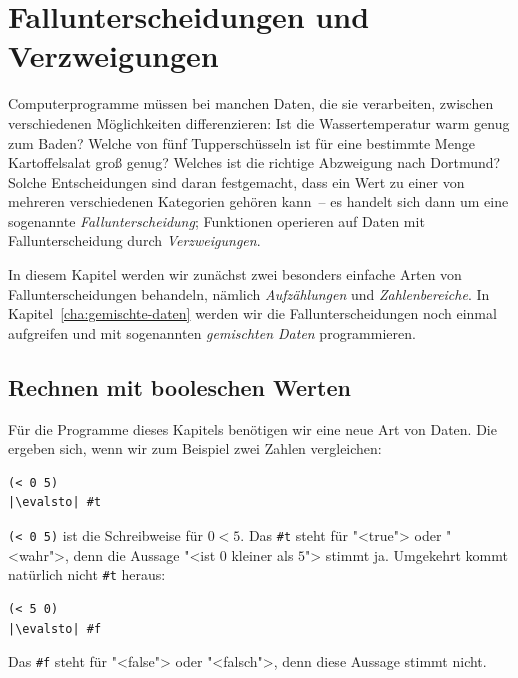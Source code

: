 
\chapter{Fallunterscheidungen und Verzweigungen}
\label{cha:conditionals}

Computerprogramme müssen bei manchen Daten, die sie
verarbeiten, zwischen verschiedenen Möglichkeiten differenzieren: Ist
die Wassertemperatur warm genug zum Baden?  Welche von fünf
Tupperschüsseln ist für eine bestimmte Menge Kartoffelsalat groß
genug?  Welches ist die richtige Abzweigung nach Dortmund?  Solche
Entscheidungen sind daran festgemacht, dass ein Wert zu einer von mehreren
verschiedenen 
Kategorien gehören kann~-- es handelt sich dann um eine sogenannte
\textit{Fallunterscheidung}; 
Funktionen operieren auf Daten mit
Fallunterscheidung durch \textit{Verzweigungen}.

In diesem Kapitel werden wir zunächst zwei besonders einfache Arten
von Fallunterscheidungen behandeln, nämlich \textit{Aufzählungen} und
\textit{Zahlenbereiche}.  In Kapitel~\ref{cha:gemischte-daten} werden
wir die Fallunterscheidungen noch einmal aufgreifen und mit
sogenannten \textit{gemischten Daten} programmieren.

\section{Rechnen mit booleschen Werten}

Für die Programme dieses Kapitels benötigen wir eine neue Art von
Daten.  Die ergeben sich, wenn wir zum Beispiel zwei Zahlen
vergleichen:
%
\begin{lstlisting}
(< 0 5)
|\evalsto| #t
\end{lstlisting}
%
\lstinline{(< 0 5)} ist die Schreibweise für $0 < 5$.  Das
\lstinline{#t} steht für "<true"> oder "<wahr">,
denn die Aussage "<ist $0$ kleiner als $5$"> stimmt ja.
Umgekehrt kommt natürlich nicht \lstinline{#t} heraus:
%
\begin{lstlisting}
(< 5 0)
|\evalsto| #f
\end{lstlisting}
%
Das \lstinline{#f} steht für "<false"> oder
"<falsch">, denn diese Aussage stimmt nicht.

